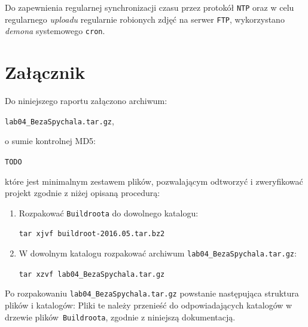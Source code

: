 \documentclass{article}
\newcommand{\labnumber}{4}
\newcommand{\buildrootver}{2016.05}
\begin{document}
Do zapewnienia regularnej synchronizacji czasu przez protokół \texttt{NTP} oraz w celu regularnego \emph{uploadu} regularnie robionych zdjęć na serwer \texttt{FTP}, wykorzystano \emph{demona} systemowego \texttt{cron}.


\section{Załącznik}

Do niniejszego raportu załączono archiwum:
\begin{center}
\texttt{lab0\labnumber\_BezaSpychala.tar.gz},
\end{center}
o sumie kontrolnej MD5:
\begin{center}
\texttt{TODO}
\end{center}
które jest minimalnym zestawem plików, pozwalającym odtworzyć i zweryfikować projekt zgodnie z niżej opisaną procedurą:
\begin{enumerate}
\item Rozpakować \texttt{Buildroota} do dowolnego katalogu:
\begin{center}
\texttt{tar xjvf buildroot-\buildrootver.tar.bz2}
\end{center}

\item W dowolnym katalogu rozpakować archiwum \texttt{lab0\labnumber\_BezaSpychala.tar.gz}:
\begin{center}
\texttt{tar xzvf lab0\labnumber\_BezaSpychala.tar.gz}
\end{center}
\end{enumerate}

Po rozpakowaniu \texttt{lab0\labnumber\_BezaSpychala.tar.gz} powstanie następująca struktura plików i katalogów:
Pliki te należy przenieść do odpowiadających katalogów w drzewie plików~\texttt{Buildroota}, zgodnie z niniejszą dokumentacją.


\newpage


\end{document}
